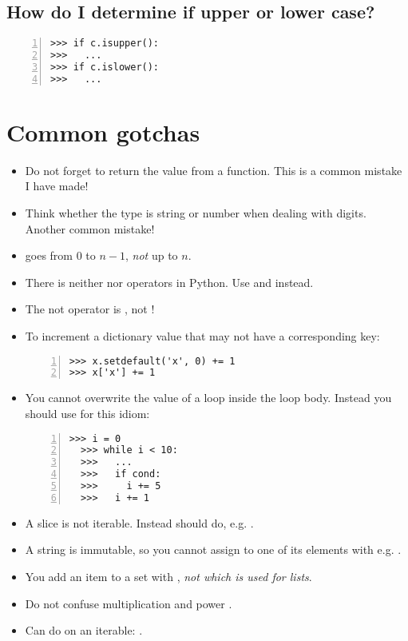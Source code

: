 \documentclass[12pt]{article}
\begin{document}
\subsection{How do I determine if upper or lower case?}
\begin{lstlisting}[numbers=left]
>>> if c.isupper():
>>>   ...
>>> if c.islower():
>>>   ...
\end{lstlisting}

\section{Common gotchas}
\begin{itemize}
\item Do not forget to return the value from a function. This is a common mistake I have made!
\item Think whether the type is string or number when dealing with digits. Another common mistake!
\item {} goes from $0$ to $n-1$, \emph{not} up to $n$.
\item There is neither \python{++} nor \python{--} operators in Python. Use  and  instead.
\item The not operator is , not !
\item To increment a dictionary value that may not have a corresponding key:

\begin{lstlisting}[numbers=left]
>>> x.setdefault('x', 0) += 1
>>> x['x'] += 1
\end{lstlisting}
\item You cannot overwrite the value of a  loop inside the loop body. Instead you should use  for this idiom:

\begin{lstlisting}[numbers=left]
  >>> i = 0
  >>> while i < 10:
  >>>   ...
  >>>   if cond:
  >>>     i += 5
  >>>   i += 1
  \end{lstlisting}
\item A slice is not iterable. Instead should do, e.g. .
\item A string is immutable, so you cannot assign to one of its elements with e.g. .
\item You add an item to a set with , \emph{not  which is used for lists}.
\item Do not confuse multiplication \python{*} and power \python{**}.
\item Can do  on an iterable: .
\end{itemize}

%
%
\end{document}
